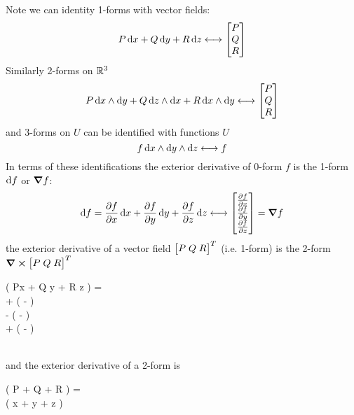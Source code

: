 %
Note we can identity 1-forms with vector fields:
\[
    P \dif x + Q \dif y + R \dif z \longleftrightarrow \begin{bmatrix}
        P \\ Q \\ R
    \end{bmatrix}
\]
%
Similarly 2-forms on \(\mathbb{R}^3\)
\[
    P \twoform{x}{y}  + Q \twoform{z}{x} + R \twoform{x}{y} \longleftrightarrow \begin{bmatrix}
        P \\ Q \\ R
    \end{bmatrix}
\]
%
and 3-forms on \(U\) can be identified with functions \(U\)
%
\[
    f \threeform{x}{y}{z} \longleftrightarrow f
\]
%
In terms of these identifications the exterior derivative of 0-form \(f\) is the 1-form \(\dif f\) or \(\grad{f}\):
\[
    \dif f = \pdv{f}{x} \dif x + \pdv{f}{y} \dif y  + \pdv{f}{z} \dif z \longleftrightarrow
    \begin{bmatrix}
        \pdv{f}{x} \\
        \pdv{f}{y} \\
        \pdv{f}{z} \\
    \end{bmatrix} = \grad{f}
\]
%
the exterior derivative of a vector field \(\begin{bmatrix}P\; Q\; R\end{bmatrix}^T\) (i.e. 1-form) is the 2-form \(\curl{ \begin{bmatrix}P\; Q\; R\end{bmatrix} ^T}\)
%
\begin{splitenv}
    \dif \left( P\dif x + Q \dif y + R \dif z \right) = \\
    + \left(  -  \right)  \\
    - \left(  -  \right)  \\
    + \left(  -  \right)   \\ \longleftrightarrow \\ 
\end{splitenv}
%
and the exterior derivative of a 2-form is
%
\begin{splitenv}
    \dif \left( P   + Q  + R  \right) = \\
    \left(  \dif x +  \dif y  +  \dif z \right)  \\
    \longleftrightarrow {}
\end{splitenv}
